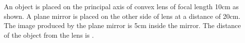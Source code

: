 \item An object is placed on the principal axis of convex lens of focal length 10cm as shown. A plane mirror is placed on the other side of lens at a distance of 20cm. The image produced by the plane mirror is 5cm inside the mirror. The distance of the object from the lens is \underline{\hspace{2.5cm}}.
    \begin{center}
    \end{center}